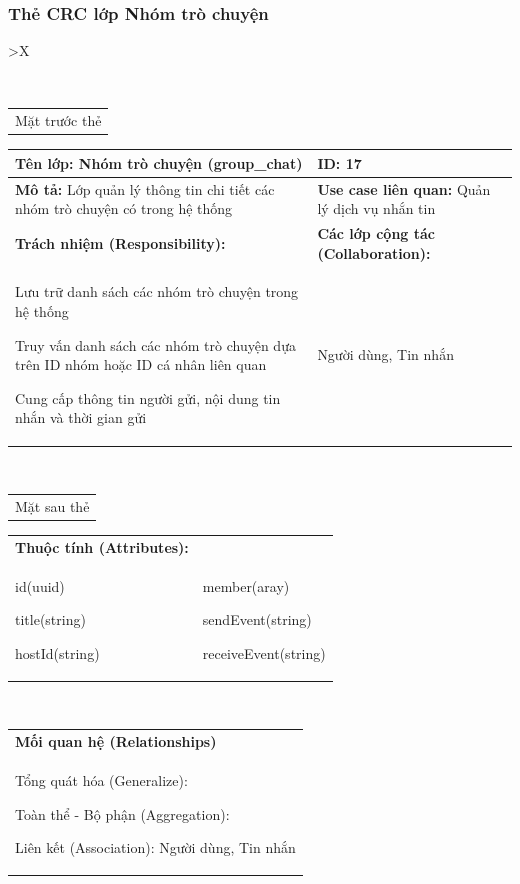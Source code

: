 \subsubsection{Thẻ CRC lớp Nhóm trò chuyện}

\begin{xltabular}{\textwidth}{
		>{\centering\arraybackslash}X
	}
	\caption{\bfseries \fontsize{12pt}{0pt}\selectfont Thẻ CRC lớp Nhóm trò chuyện}
	\\
	\begin{tabularx}{0.9\textwidth}{X}
		Mặt trước thẻ
	\end{tabularx}
	\begin{tabularx}{0.9\textwidth}{|X|X|}
		\hline
		\textbf{Tên lớp:} Nhóm trò chuyện (group\_chat)                                      & \textbf{ID:} 17                                        \\
		\hline
		\textbf{Mô tả:} Lớp quản lý thông tin chi tiết các nhóm trò chuyện có trong hệ thống & \textbf{Use case liên quan:}  Quản lý dịch vụ nhắn tin \\
		\hline
		\textbf{Trách nhiệm (Responsibility):}                                               & \textbf{Các lớp cộng tác (Collaboration):}             \\
		Lưu trữ danh sách các nhóm trò chuyện trong hệ thống

		Truy vấn danh sách các nhóm trò chuyện dựa trên ID nhóm hoặc ID cá nhân liên quan

		Cung cấp thông tin người gửi, nội dung tin nhắn và thời gian gửi
		                                                                                     &
		Người dùng, Tin nhắn
		\\
		\hline
	\end{tabularx}
	\\
	\begin{tabularx}{0.9\textwidth}{X}
		Mặt sau thẻ
	\end{tabularx}
	\begin{tabularx}{0.9\textwidth}{|X|X|}
		\hline
		\textbf{Thuộc tính (Attributes):} & \\
		id(uuid)

		title(string)

		hostId(string)
		                                  &
		member(aray)

		sendEvent(string)

		receiveEvent(string)
		\\ \hline
	\end{tabularx}
	\\
	\begin{tabularx}{0.9\textwidth}{|X|}
		\hline
		\textbf{Mối quan hệ (Relationships)} \\
		Tổng quát hóa (Generalize):

		Toàn thể - Bộ phận (Aggregation):

		Liên kết (Association): Người dùng, Tin nhắn
		\\
		\hline
	\end{tabularx}
\end{xltabular}


